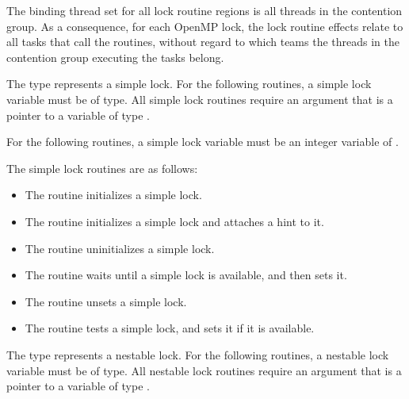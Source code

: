 \vspace{-8pt}

\binding
The binding thread set for all lock routine regions is all threads in the contention group. 
As a consequence, for each OpenMP lock, the lock routine effects relate to all tasks that 
call the routines, without regard to which teams the threads in the contention group 
executing the tasks belong.


\vspace{-8pt}

\ccppspecificstart
The type  represents a simple lock. For the 
following routines, a simple lock variable must be of  type. All simple 
lock routines require an argument that is a pointer to a variable of type .
\ccppspecificend

\fortranspecificstart
For the following routines, a simple lock variable must be an integer variable of 
.
\fortranspecificend

The simple lock routines are as follows:

\begin{itemize}
\item The  routine initializes a simple lock.

\item The  routine initializes a simple lock and attaches a hint to it.

\item The  routine uninitializes a simple lock.

\item The  routine waits until a simple lock is available, and then sets it.

\item The  routine unsets a simple lock.

\item The  routine tests a simple lock, and sets it if it is available.
\end{itemize}

\ccppspecificstart
The type  represents a nestable lock. 
For the following routines, a nestable lock variable must be of  type. 
All nestable lock routines require an argument that is a pointer to a variable of type 
.
\ccppspecificend

